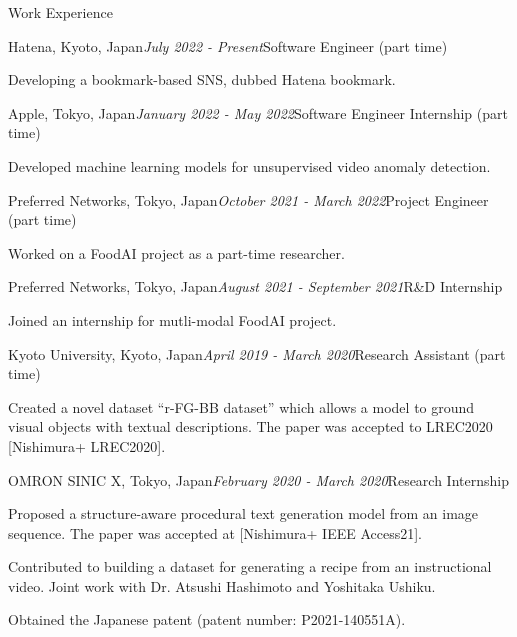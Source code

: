 \begin{rSection}{Work Experience}
\begin{rSubsection}{Hatena, Kyoto, Japan}{\em July 2022 - Present}{Software Engineer (part time)}{}
\item Developing a bookmark-based SNS, dubbed Hatena bookmark.
\end{rSubsection}

\begin{rSubsection}{Apple, Tokyo, Japan}{\em January 2022 - May 2022}{Software Engineer Internship (part time)}{}
\item Developed machine learning models for unsupervised video anomaly detection.
\end{rSubsection}

\begin{rSubsection}{Preferred Networks, Tokyo, Japan}{\em October 2021 - March 2022}{Project Engineer (part time)}{}
\item Worked on a FoodAI project as a part-time researcher.
\end{rSubsection}

\begin{rSubsection}{Preferred Networks, Tokyo, Japan}{\em August 2021 - September 2021}{R\&D Internship}{}
\item Joined an internship for mutli-modal FoodAI project.
\end{rSubsection}

\begin{rSubsection}{Kyoto University, Kyoto, Japan}{\em April 2019 - March 2020}{Research Assistant (part time)}{}
\item Created a novel dataset ``r-FG-BB dataset'' which allows a model to ground visual objects with textual descriptions. The paper was accepted to LREC2020 [Nishimura+ LREC2020].
\end{rSubsection}

\begin{rSubsection}{OMRON SINIC X, Tokyo, Japan}{\em February 2020 - March 2020}{Research Internship}{}
\item Proposed a structure-aware procedural text generation model from an image sequence. The paper was accepted at [Nishimura+ IEEE Access21].
\item Contributed to building a dataset for generating a recipe from an instructional video. Joint work with Dr. Atsushi Hashimoto and Yoshitaka Ushiku.
\item Obtained the Japanese patent (patent number: P2021-140551A).
\end{rSubsection}


\end{rSection}
